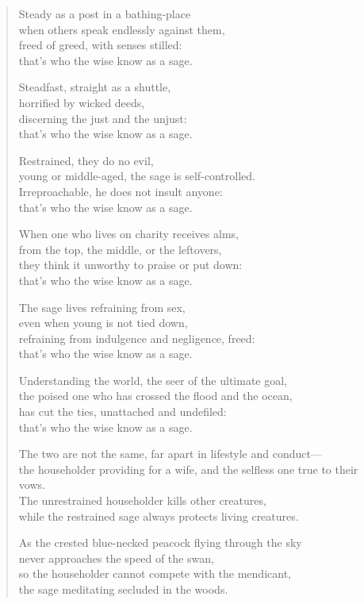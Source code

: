 \documentclass[12pt,openany]{book}%
\begin{document}
\begin{verse}
Steady as a post in a bathing-place \\
when others speak endlessly against them, \\
freed of greed, with senses stilled: \\
that’s who the wise know as a sage. 

Steadfast, straight as a shuttle, \\
horrified by wicked deeds, \\
discerning the just and the unjust: \\
that’s who the wise know as a sage. 

Restrained, they do no evil, \\
young or middle-aged, the sage is self-controlled. \\
Irreproachable, he does not insult anyone: \\
that’s who the wise know as a sage. 

When one who lives on charity receives alms, \\
from the top, the middle, or the leftovers, \\
they think it unworthy to praise or put down: \\
that’s who the wise know as a sage. 

The sage lives refraining from sex, \\
even when young is not tied down, \\
refraining from indulgence and negligence, freed: \\
that’s who the wise know as a sage. 

Understanding the world, the seer of the ultimate goal, \\
the poised one who has crossed the flood and the ocean, \\
has cut the ties, unattached and undefiled: \\
that’s who the wise know as a sage. 

The two are not the same, far apart in lifestyle and conduct—\\
the householder providing for a wife, and the selfless one true to their vows. \\
The unrestrained householder kills other creatures, \\
while the restrained sage always protects living creatures. 

As the crested blue-necked peacock flying through the sky \\
never approaches the speed of the swan, \\
so the householder cannot compete with the mendicant, \\
the sage meditating secluded in the woods. 

%
\end{verse}
\end{document}
